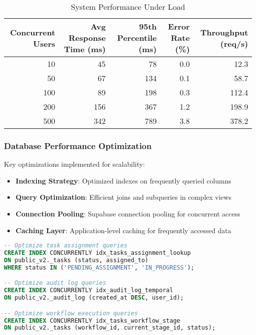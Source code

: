 \begin{table}[htbp]
\centering
\caption{System Performance Under Load}
\label{tab:performance-results}
\begin{tabular}{|r|r|r|r|r|}
\hline
\textbf{Concurrent Users} & \textbf{Avg Response Time (ms)} & \textbf{95th Percentile (ms)} & \textbf{Error Rate (\%)} & \textbf{Throughput (req/s)} \\
\hline
10 & 45 & 78 & 0.0 & 12.3 \\
50 & 67 & 134 & 0.1 & 58.7 \\
100 & 89 & 198 & 0.3 & 112.4 \\
200 & 156 & 367 & 1.2 & 198.9 \\
500 & 342 & 789 & 3.8 & 378.2 \\
\hline
\end{tabular}
\end{table}

\subsubsection{Database Performance Optimization}

Key optimizations implemented for scalability:

\begin{itemize}
    \item \textbf{Indexing Strategy}: Optimized indexes on frequently queried columns
    \item \textbf{Query Optimization}: Efficient joins and subqueries in complex views
    \item \textbf{Connection Pooling}: Supabase connection pooling for concurrent access
    \item \textbf{Caching Layer}: Application-level caching for frequently accessed data
\end{itemize}

\begin{lstlisting}[language=sql, caption=Performance-Critical Index Examples]
-- Optimize task assignment queries
CREATE INDEX CONCURRENTLY idx_tasks_assignment_lookup 
ON public_v2._tasks (status, assigned_to) 
WHERE status IN ('PENDING_ASSIGNMENT', 'IN_PROGRESS');

-- Optimize audit log queries
CREATE INDEX CONCURRENTLY idx_audit_log_temporal
ON public_v2._audit_log (created_at DESC, user_id);

-- Optimize workflow execution queries  
CREATE INDEX CONCURRENTLY idx_tasks_workflow_stage
ON public_v2._tasks (workflow_id, current_stage_id, status);
\end{lstlisting}

